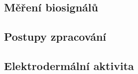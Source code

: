 \subsection{Měření biosignálů}
\label{subsec:srdecni_aktivita}

\subsection{Postupy zpracování}
\label{subsec:respiracni_aktivita}

\subsection{Elektrodermální aktivita}
\label{subsec:elektrodermalni_aktivita}